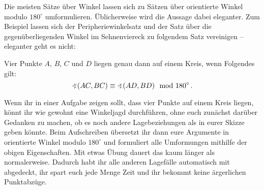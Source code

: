 Die meisten Sätze über Winkel lassen sich zu Sätzen über orientierte Winkel modulo $180^\circ$ umformulieren. Üblicherweise wird die Aussage dabei eleganter. Zum Beispiel lassen sich der Peripheriewinkelsatz und der Satz über die gegenüberliegenden Winkel im Sehnenviereck zu folgendem Satz vereinigen -- eleganter geht es nicht:
\begin{satzmitnamen}
	Vier Punkte $A$, $B$, $C$ und $D$ liegen genau dann auf einem Kreis, wenn Folgendes gilt:
	\begin{equation*}
		\winkel(AC,BC)\equiv\winkel(AD,BD) \mod 180^\circ\,.
	\end{equation*}
\end{satzmitnamen}
Wenn ihr in einer Aufgabe zeigen sollt, dass vier Punkte auf einem Kreis liegen, könnt ihr wie gewohnt eine Winkeljagd durchführen, ohne euch zunächst darüber Gedanken zu machen, ob es noch andere Lagebeziehungen als in eurer Skizze geben könnte. Beim Aufschreiben übersetzt ihr dann eure Argumente in orientierte Winkel modulo $180^\circ$ und formuliert alle Umformungen mithilfe der obigen Eigenschaften. Mit etwas Übung dauert das kaum länger als normalerweise. Dadurch habt ihr alle anderen Lagefälle automatisch mit abgedeckt, ihr spart euch jede Menge Zeit und ihr bekommt keine ärgerlichen Punktabzüge.


